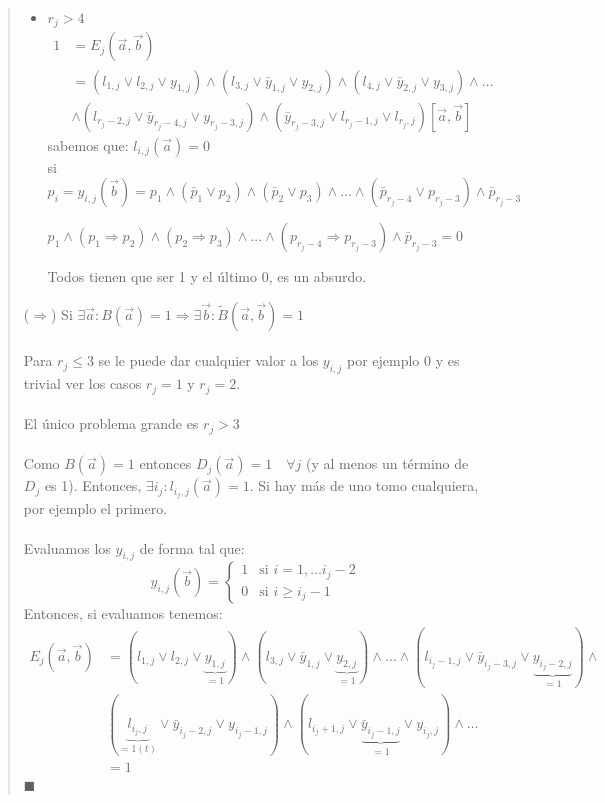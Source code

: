 \documentclass[11pt, a4paper]{article}
\theoremstyle{definition}
\begin{document}
\begin{quote}
\begin{itemize}
        \item $r_j > 4$
        \begin{align*}
        1 &= E_j(\vec{a}, \vec{b}) \\
        &= (l_{1,j} \vee l_{2,j} \vee y_{1,j}) \wedge (l_{3,j} \vee \bar{y}_{1,j} \vee y_{2,j}) \wedge (l_{4,j} \vee \bar{y}_{2,j} \vee y_{3,j}) \wedge \ldots \\
        &\wedge (l_{r_j-2,j} \vee \bar{y}_{r_j-4,j} \vee y_{r_j-3,j}) \wedge (\bar{y}_{r_j-3,j} \vee l_{r_j-1,j} \vee l_{r_j,j})[\vec{a}, \vec{b}]
        \end{align*}
        sabemos que: $l_{i,j}(\vec{a}) = 0$\\
        si $p_i = y_{i,j}(\vec{b}) = p_1 \wedge (\bar{p}_1 \vee p_2) \wedge (\bar{p}_2 \vee p_3) \wedge \ldots \wedge (\bar{p}_{r_j-4} \vee p_{r_j-3}) \wedge \bar{p}_{r_j-3}$
        
        $p_1 \wedge (p_1 \Rightarrow p_2) \wedge (p_2 \Rightarrow p_3) \wedge \ldots \wedge (p_{r_j-4} \Rightarrow p_{r_j-3}) \wedge \bar{p}_{r_j-3} = 0$
        
        Todos tienen que ser 1 y el último 0, es un absurdo.
        \end{itemize}
    ($\Rightarrow$) Si $\exists \vec{a} : B(\vec{a}) = 1 \Rightarrow \exists \vec{b} : \tilde{B}(\vec{a}, \vec{b}) = 1$\\ \\
    Para $r_j \leq 3$ se le puede dar cualquier valor a los $y_{i,j}$ por ejemplo 0 y es trivial ver los
    casos $r_j = 1$ y $r_j = 2$. \\ \\
    El único problema grande es $r_j > 3$\\ \\
    Como $B(\vec{a}) = 1$ entonces $D_j(\vec{a}) = 1 \quad \forall j$ (y al menos un término de $D_j$ es 1). Entonces,
    $\exists i_j : l_{i_j,j}(\vec{a}) = 1$. Si hay más de uno tomo cualquiera, por ejemplo el primero.\\ \\
    Evaluamos los $y_{i,j}$ de forma tal que:
    \[
        y_{i,j}(\vec{b}) = 
        \begin{cases}
        1 & \text{si } i = 1, \ldots i_j - 2 \\
        0 & \text{si } i \geq i_j - 1
        \end{cases}
    \]
    Entonces, si evaluamos tenemos:
    \begin{align*}
        E_j(\vec{a}, \vec{b}) &= (l_{1,j} \vee l_{2,j} \vee \underbrace{y_{1,j}}_{=1}) \wedge
        (l_{3,j} \vee \bar{y}_{1,j} \vee \underbrace{y_{2,j}}_{=1}) \wedge \ldots \wedge
        (l_{i_j-1,j} \vee \bar{y}_{i_j-3,j} \vee \underbrace{y_{i_j-2,j}}_{=1}) \wedge \\
        &(\underbrace{l_{i_j,j}}_{=1(t)} \vee \bar{y}_{i_j-2,j} \vee y_{i_j-1,j}) \wedge
        (l_{i_j+1,j} \vee \underbrace{\bar{y}_{i_j-1,j}}_{=1} \vee y_{i_j,j}) \wedge \ldots \\
        &= 1
        \end{align*}
    $\blacksquare$

\end{quote}
\end{document}
